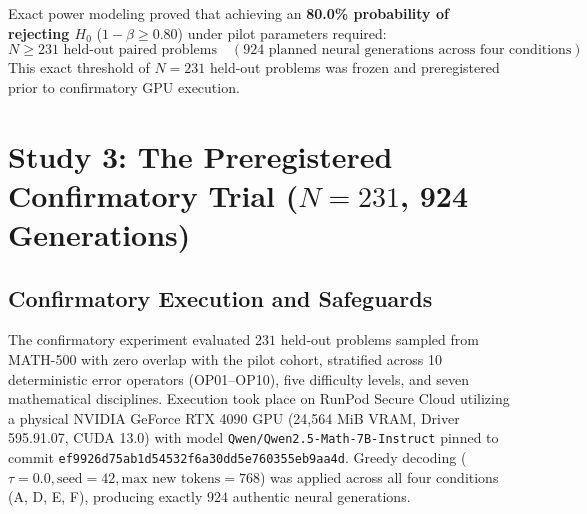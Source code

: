 \documentclass[11pt]{article}
\begin{document}
Exact power modeling proved that achieving an \textbf{80.0\% probability of rejecting $H_0$} ($1 - \beta \ge 0.80$) under pilot parameters required:
\begin{equation}
N \ge 231 \text{ held-out paired problems} \quad (924 \text{ planned neural generations across four conditions})
\end{equation}
This exact threshold of $N=231$ held-out problems was frozen and preregistered prior to confirmatory GPU execution.

\section{Study 3: The Preregistered Confirmatory Trial ($N=231$, 924 Generations)}
\label{sec:study3_confirmatory}

\subsection{Confirmatory Execution and Safeguards}
The confirmatory experiment evaluated $231$ held-out problems sampled from MATH-500 with zero overlap with the pilot cohort, stratified across 10 deterministic error operators (OP01--OP10), five difficulty levels, and seven mathematical disciplines. Execution took place on RunPod Secure Cloud utilizing a physical NVIDIA GeForce RTX 4090 GPU (24,564 MiB VRAM, Driver 595.91.07, CUDA 13.0) with model \texttt{Qwen/Qwen2.5-Math-7B-Instruct} pinned to commit \texttt{ef9926d75ab1d54532f6a30dd5e760355eb9aa4d}. Greedy decoding ($\tau = 0.0, \text{seed} = 42, \text{max new tokens} = 768$) was applied across all four conditions (A, D, E, F), producing exactly $924$ authentic neural generations.
\end{document}
